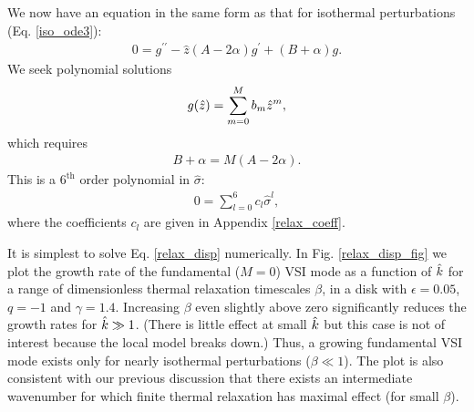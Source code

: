 We now have an equation in the same form as that for isothermal
perturbations (Eq. \ref{iso_ode3}):
\begin{align}
  0 = g^{\prime\prime} - \hat{z}\left(A - 2\alpha\right)g^\prime +
  \left(B + \alpha\right)g.
\end{align}
We seek polynomial solutions 
\begin{align}
  g(\hat{z}) = \sum_{m=0}^M b_m \hat{z}^m,
\end{align}
which requires
\begin{align}
  B + \alpha = M\left(A-2\alpha\right).\label{adia_disp0}
\end{align}
This is a $6^\mathrm{th}$ order 
polynomial in $\hat{\sigma}$:  
\begin{align}
  0 = \sum_{l=0}^{6}c_l\hat{\sigma}^l,\label{relax_disp}
\end{align}
where the coefficients $c_l$ are given in Appendix \ref{relax_coeff}.

It is simplest to solve Eq. \ref{relax_disp} numerically. In
Fig. \ref{relax_disp_fig} we plot the growth rate of the fundamental
($M=0$) VSI mode as a function of $\hat{k}$ for a range of
dimensionless thermal relaxation timescales $\beta$, in a disk with
$\epsilon=0.05$, $q=-1$ and $\gamma=1.4$. Increasing $\beta$ even
slightly above zero significantly reduces the growth rates for
$\hat{k}\gg 1$. (There is little effect at small $\hat{k}$ but this case is
not of interest because the local model breaks down.) Thus, 
a growing fundamental VSI mode exists only for nearly
isothermal perturbations ($\beta\ll 1$).  The plot is also consistent with our previous
discussion that there exists an intermediate wavenumber for which
finite thermal relaxation has maximal effect (for small $\beta$). 

